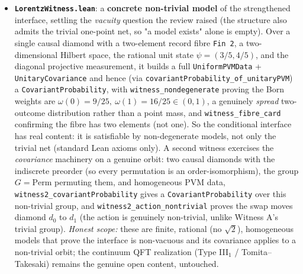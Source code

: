 \documentclass[11pt,a4paper]{article}
\begin{document}
\begin{itemize}
the adversarial review outlined. \textbf{(Full PVM preservation)} \texttt{unitary\_preserves\_resolution} proves $U(\sum_x E_x)U^\dagger = U\,U^\dagger = 1$ (using $UU^\dagger=1$ derived from the finite-square $U^\dagger U=1$), so the unitary transport preserves the \emph{resolution of identity}, not just individual projections, the boosted effects are a \emph{full} PVM. What remains genuinely open is now only: the boundary-action/reconstruction compatibility, and, the principal gap, the continuum \emph{realization} (existence of such a net, with its unitary Poincaré transport, from a genuine relativistic QFT: the Type III$_1$ / Tomita–Takesaki problem). Every reachable assumption-to-theorem conversion in the finite conditional interface is complete: the interface is rigid, connected, a \emph{covariant probability distribution} with covariance derived from unitarity, coherent under transport (a full PVM preserved by the action), and carries a genuine group action on its global sections; its \emph{instantiation} from QFT is the open problem.
  \item \textbf{\texttt{LorentzWitness.lean}}: a \textbf{concrete non-trivial model} of the strengthened interface, settling the \emph{vacuity} question the review raised (the structure also admits the trivial one-point net, so "a model exists" alone is empty). Over a single causal diamond with a two-element record fibre \texttt{Fin 2}, a two-dimensional Hilbert space, the rational unit state $\psi=(3/5,4/5)$, and the diagonal projective measurement, it builds a full \texttt{UniformPVMData} + \texttt{UnitaryCovariance} and hence (via \texttt{covariantProbability\_of\_unitaryPVM}) a \texttt{CovariantProbability}, with \texttt{witness\_nondegenerate} proving the Born weights are $\omega(0)=9/25,\ \omega(1)=16/25 \in (0,1)$, a genuinely \emph{spread} two-outcome distribution rather than a point mass, and \texttt{witness\_fibre\_card} confirming the fibre has two elements (not one). So the conditional interface has real content: it is satisfiable by non-degenerate models, not only the trivial net (standard Lean axioms only). A second witness exercises the \emph{covariance} machinery on a genuine orbit: two causal diamonds with the indiscrete preorder (so every permutation is an order-isomorphism), the group $G=\mathrm{Perm}$ permuting them, and homogeneous PVM data, \texttt{witness2\_covariantProbability} gives a \texttt{CovariantProbability} over this non-trivial group, and \texttt{witness2\_action\_nontrivial} proves the swap moves diamond $d_0$ to $d_1$ (the action is genuinely non-trivial, unlike Witness A's trivial group). \emph{Honest scope:} these are finite, rational (no $\sqrt 2$), homogeneous models that prove the interface is non-vacuous and its covariance applies to a non-trivial orbit; the continuum QFT realization (Type III$_1$ / Tomita–Takesaki) remains the genuine open content, untouched.
\end{itemize}
\end{document}
